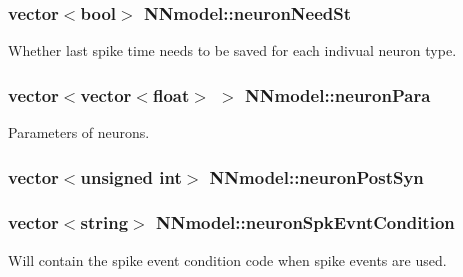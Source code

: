 \hypertarget{classNNmodel_ad14509938bfeb7f2fc8f011d2ec995ac}{
\subsubsection[{neuron\+Need\+St}]{\setlength{\rightskip}{0pt plus 5cm}vector$<$bool$>$ N\+Nmodel\+::neuron\+Need\+St}}\label{classNNmodel_ad14509938bfeb7f2fc8f011d2ec995ac}


Whether last spike time needs to be saved for each indivual neuron type. 

\hypertarget{classNNmodel_a4711c16ac1dc4bd09255f69a3469a4bd}{
\subsubsection[{neuron\+Para}]{\setlength{\rightskip}{0pt plus 5cm}vector$<$vector$<$float$>$ $>$ N\+Nmodel\+::neuron\+Para}}\label{classNNmodel_a4711c16ac1dc4bd09255f69a3469a4bd}


Parameters of neurons. 

\hypertarget{classNNmodel_aec217846b4a0eeb38bfec1209319dd81}{
\subsubsection[{neuron\+Post\+Syn}]{\setlength{\rightskip}{0pt plus 5cm}vector$<$unsigned int$>$ N\+Nmodel\+::neuron\+Post\+Syn}}\label{classNNmodel_aec217846b4a0eeb38bfec1209319dd81}
\hypertarget{classNNmodel_a2107fc30756637a876374ad35d69a19b}{
\subsubsection[{neuron\+Spk\+Evnt\+Condition}]{\setlength{\rightskip}{0pt plus 5cm}vector$<$string$>$ N\+Nmodel\+::neuron\+Spk\+Evnt\+Condition}}\label{classNNmodel_a2107fc30756637a876374ad35d69a19b}


Will contain the spike event condition code when spike events are used. 

